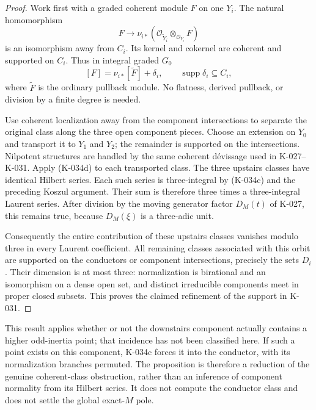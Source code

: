 \begin{proof}
Work first with a graded coherent module $F$ on one $Y_i$.
The natural homomorphism
\[
 F\longrightarrow \nu_{i*}
             (\mathcal O_{\widetilde Y_i}\otimes_{\mathcal O_{Y_i}}F)
\]
is an isomorphism away from $C_i$.  Its kernel and cokernel are
coherent and supported on $C_i$.  Thus in integral graded $G_0$
\[
                [F]=\nu_{i*}[\widetilde F]+\delta_i,
             \qquad \operatorname{supp}\delta_i\subseteq C_i,
                                                        \tag{K-034d}
\]
where $\widetilde F$ is the ordinary pullback module.  No flatness,
derived pullback, or division by a finite degree is needed.

Use coherent localization away from the component intersections
to separate the original class along the three open component
pieces.  Choose an extension on $Y_0$ and transport it to $Y_1$
and $Y_2$; the remainder is supported on the intersections.
Nilpotent structures are handled by the same coherent
d\'evissage used in K-027--K-031.  Apply (K-034d) to each transported
class.  The three upstairs classes have identical Hilbert series.
Each such series is three-integral by (K-034c) and the preceding
Koszul argument.  Their sum is therefore three times a
three-integral Laurent series.  After division by the moving
generator factor $D_M(t)$ of K-027, this remains true, because
$D_M(\xi)$ is a three-adic unit.

Consequently the entire contribution of these upstairs classes
vanishes modulo three in every Laurent coefficient.  All
remaining classes associated with this orbit are supported on
the conductors or component intersections, precisely the sets
$D_i$.  Their dimension is at most three: normalization is
birational and an isomorphism on a dense open set, and distinct
irreducible components meet in proper closed subsets.  This
proves the claimed refinement of the support in K-031.
\end{proof}

This result applies whether or not the downstairs component
actually contains a higher odd-inertia point; that incidence has
not been classified here.  If such a point exists on this
component, K-034c forces it into the conductor, with its
normalization branches permuted.  The proposition is therefore a
reduction of the genuine coherent-class obstruction, rather than
an inference of component normality from its Hilbert series.
It does not compute the conductor class and does not settle the
global exact-$M$ pole.

